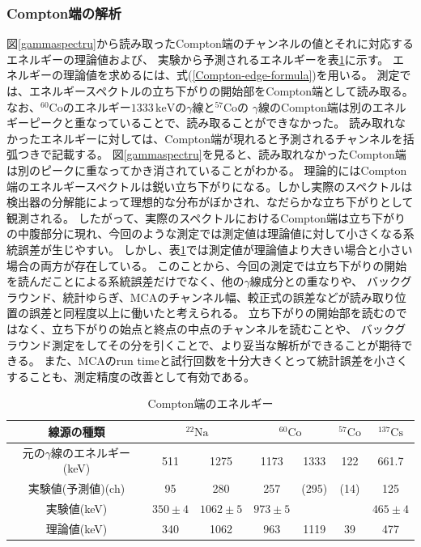 \documentclass[11pt, titlepage, openany]{ltjsbook}
\newcommand{\slashcell}{\diagbox[width=3.5em,height=2em]{}{}}
\begin{document}
\subsubsection{Compton端の解析}
図\ref{gammaspectru}から読み取ったCompton端のチャンネルの値とそれに対応するエネルギーの理論値および、
実験から予測されるエネルギーを表\ref{Compton-edge-table}に示す。
エネルギーの理論値を求めるには、式(\ref{Compton-edge-formula})を用いる。
測定では、エネルギースペクトルの立ち下がりの開始部をCompton端として読み取る。
なお、$^{60}\mathrm{Co}$のエネルギー$1333\,\mathrm{keV}$の$\gamma$線と$^{57}\mathrm{Co}$の
$\gamma$線のCompton端は別のエネルギーピークと重なっていることで、読み取ることができなかった。
読み取れなかったエネルギーに対しては、Compton端が現れると予測されるチャンネルを括弧つきで記載する。
図\ref{gammaspectru}を見ると、読み取れなかったCompton端は別のピークに重なってかき消されていることがわかる。
理論的にはCompton端のエネルギースペクトルは鋭い立ち下がりになる。しかし実際のスペクトルは検出器の分解能によって理想的な分布がぼかされ、なだらかな立ち下がりとして観測される。
したがって、実際のスペクトルにおけるCompton端は立ち下がりの中腹部分に現れ、今回のような測定では測定値は理論値に対して小さくなる系統誤差が生じやすい。
しかし、表\ref{Compton-edge-table}では測定値が理論値より大きい場合と小さい場合の両方が存在している。
このことから、今回の測定では立ち下がりの開始を読んだことによる系統誤差だけでなく、他の$\gamma$線成分との重なりや、
バックグラウンド、統計ゆらぎ、MCAのチャンネル幅、較正式の誤差などが読み取り位置の誤差と同程度以上に働いたと考えられる。
立ち下がりの開始部を読むのではなく、立ち下がりの始点と終点の中点のチャンネルを読むことや、
バックグラウンド測定をしてその分を引くことで、より妥当な解析ができることが期待できる。
また、MCAのrun timeと試行回数を十分大きくとって統計誤差を小さくすることも、測定精度の改善として有効である。
\begin{table}[H]
    \centering
    \begin{tabular}{c|c|c|c|c|c|c}
        線源の種類 & \multicolumn{2}{c|}{$^{22}\mathrm{Na}$} & \multicolumn{2}{c|}{$^{60}\mathrm{Co}$} & $^{57}\mathrm{Co}$ & $^{137}\mathrm{Cs}$ \\ \hline
        元の$\gamma$線のエネルギー(keV) & 511 & 1275 & 1173 & 1333 & 122 & 661.7 \\ \hline
        実験値(予測値)(ch) & 95 & 280 & 257 & (295) & (14) & 125 \\ \hline
        実験値(keV) & $350 \pm 4$ & $1062 \pm 5$ & $973 \pm 5$ & \slashcell & \slashcell &$465 \pm 4$ \\ \hline
        理論値(keV) & 340 & 1062 & 963 & 1119 & 39 & 477
    \end{tabular}
    \caption{Compton端のエネルギー}
    \label{Compton-edge-table}
\end{table}
\end{document}
